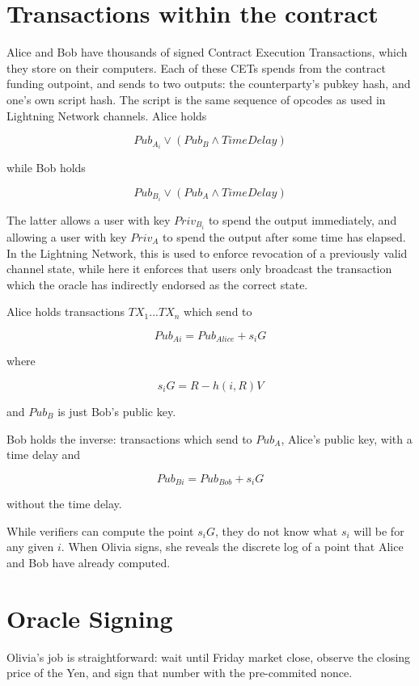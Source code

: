 \documentclass[11pt]{article}
\begin{document}
\section*{Transactions within the contract}

Alice and Bob have thousands of signed Contract Execution Transactions,  which they store on their computers.  Each of these CETs spends from the contract funding outpoint, and sends to two outputs: the counterparty's pubkey hash, and one's own script hash.  The script is the same sequence of opcodes as used in Lightning Network channels.  Alice holds

\[Pub_{A_i} \lor (Pub_{B} \land TimeDelay)\]

while Bob holds

\[Pub_{B_i} \lor (Pub_{A} \land TimeDelay)\]


The latter allows a user with key \(Priv_{B_i}\) to spend the output immediately, and allowing a user with key \(Priv_{A}\) to spend the output after some time has elapsed.  In the Lightning Network, this is used to enforce revocation of a previously valid  channel state,  while  here it enforces  that users only broadcast the transaction which the oracle has indirectly endorsed as the correct state.

Alice holds transactions \(TX_{1} ... TX_{n}\) which send to

\[Pub_{Ai} = Pub_{Alice} + s_iG\]

where 

\[s_iG = R - h(i, R)V\]

and \(Pub_B\) is just Bob's public key.

Bob holds the inverse: transactions which send to \(Pub_A\), Alice's public key, with a time delay and 

\[Pub_{Bi} = Pub_{Bob} + s_iG\]

without the time delay.

While verifiers can compute the point \(s_iG\), they do not know what \(s_i\) will be for any given \(i\).  When Olivia signs, she reveals the discrete log of a point that Alice and Bob have already computed.

\section*{Oracle Signing}

Olivia's job is straightforward: wait until Friday market close, observe the closing price of the Yen, and sign that number with the pre-commited nonce.
\end{document}
